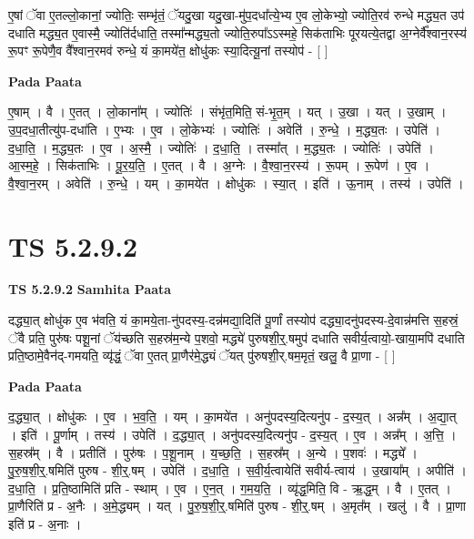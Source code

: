 \documentclass[17pt]{extarticle}
\begin{document}
ए॒षां ॅवा ए॒तल्लो॒कानां॒ ज्योतिः॒ सम्भृ॑तं॒ ॅयदु॒खा यदु॒खा-मु॑प॒दधा᳚त्ये॒भ्य ए॒व लो॒केभ्यो॒ ज्योति॒रव॑ रुन्धे मद्ध्य॒त उप॑ दधाति मद्ध्य॒त ए॒वास्मै॒ ज्योति॑र्दधाति॒ तस्मा᳚न्मद्ध्य॒तो ज्योति॒रुपा᳚ऽऽस्महे॒ सिक॑ताभिः पूरयत्ये॒तद्वा अ॒ग्नेर्वै᳚श्वान॒रस्य॑ रू॒पꣳ रू॒पेणै॒व वै᳚श्वान॒रमव॑ रुन्धे॒ यं का॒मये॑त॒ क्षोधु॑कः स्या॒दित्यू॒नां तस्योप॑ - [  ] \newline

\textbf{Pada Paata} \newline

ए॒षाम् । वै । ए॒तत् । लो॒काना᳚म् । ज्योतिः॑ । संभृ॑त॒मिति॒ सं-भृ॒त॒म् । यत् । उ॒खा । यत् । उ॒खाम् । उ॒प॒दधा॒तीत्यु॑प-दधा॑ति । ए॒भ्यः । ए॒व । लो॒केभ्यः॑ । ज्योतिः॑ । अवेति॑ । रु॒न्धे॒ । म॒द्ध्य॒तः । उपेति॑ । द॒धा॒ति॒ । म॒द्ध्य॒तः । ए॒व । अ॒स्मै॒ । ज्योतिः॑ । द॒धा॒ति॒ । तस्मा᳚त् । म॒द्ध्य॒तः । ज्योतिः॑ । उपेति॑ । आ॒स्म॒हे॒ । सिक॑ताभिः । पू॒र॒य॒ति॒ । ए॒तत् । वै । अ॒ग्नेः । वै॒श्वा॒न॒रस्य॑ । रू॒पम् । रू॒पेण॑ । ए॒व । वै॒श्वा॒न॒रम् । अवेति॑ । रु॒न्धे॒ । यम् । का॒मये॑त । क्षोधु॑कः । स्या॒त् । इति॑ । ऊ॒नाम् । तस्य॑ । उपेति॑ ।  \newline




\section*{ TS 5.2.9.2 }

\textbf{TS 5.2.9.2 } \newline
\textbf{Samhita Paata} \newline

दद्ध्या॒त् क्षोधु॑क ए॒व भ॑वति॒ यं का॒मये॒ता-नु॑पदस्य॒-दन्न॑मद्या॒दिति॑ पू॒र्णां तस्योप॑ दद्ध्या॒दनु॑पदस्य-दे॒वान्न॑मत्ति स॒हस्रं॒ ॅवै प्रति॒ पुरु॑षः पशू॒नां ॅय॑च्छति स॒हस्र॑म॒न्ये प॒शवो॒ मद्ध्ये॑ पुरुषशी॒र्॒.षमुप॑ दधाति सवीर्य॒त्वायो॒-खाया॒मपि॑ दधाति प्रति॒ष्ठामे॒वैन॑द्-गमयति॒ व्यृ॑द्धं॒ ॅवा ए॒तत् प्रा॒णैर॑मे॒द्ध्यं ॅयत् पु॑रुषशी॒र्.षम॒मृतं॒ खलु॒ वै प्रा॒णा - [  ] \newline

\textbf{Pada Paata} \newline

द॒द्ध्या॒त् । क्षोधु॑कः । ए॒व । भ॒व॒ति॒ । यम् । का॒मये॑त । अनु॑पदस्य॒दित्यनु॑प - द॒स्य॒त् । अन्न᳚म् । अ॒द्या॒त् । इति॑ । पू॒र्णाम् । तस्य॑ । उपेति॑ । द॒द्ध्या॒त् । अनु॑पदस्य॒दित्यनु॑प - द॒स्य॒त् । ए॒व । अन्न᳚म् । अ॒त्ति॒ । स॒हस्र᳚म् । वै । प्रतीति॑ । पुरु॑षः । प॒शू॒नाम् । य॒च्छ॒ति॒ । स॒हस्र᳚म् । अ॒न्ये । प॒शवः॑ । मद्ध्ये᳚ । पु॒रु॒ष॒शी॒र्॒.षमिति॑ पुरुष - शी॒र्॒.षम् । उपेति॑ । द॒धा॒ति॒ । स॒वी॒र्य॒त्वायेति॑ सवीर्य-त्वाय॑ । उ॒खाया᳚म् । अपीति॑ । द॒धा॒ति॒ । प्र॒ति॒ष्ठामिति॑ प्रति - स्थाम् । ए॒व । ए॒न॒त् । ग॒म॒य॒ति॒ । व्यृ॑द्ध॒मिति॒ वि - ऋ॒द्ध॒म् । वै । ए॒तत् । प्रा॒णैरिति॑ प्र - अ॒नैः । अ॒मे॒द्ध्यम् । यत् । पु॒रु॒ष॒शी॒र्॒.षमिति॑ पुरुष - शी॒र्॒.षम् । अ॒मृत᳚म् । खलु॑ । वै । प्रा॒णा इति॑ प्र - अ॒नाः ।  \newline
\end{document}
